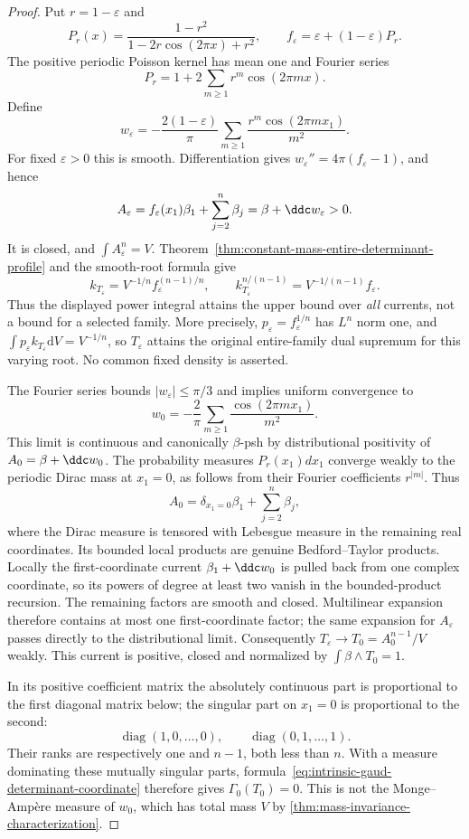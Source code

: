 \begin{proof}
Put $r=1-\varepsilon$ and
\[
 P_r(x)=\frac{1-r^2}{1-2r\cos(2\pi x)+r^2},\qquad
 f_\varepsilon=\varepsilon+(1-\varepsilon)P_r.
\]
The positive periodic Poisson kernel has mean one and Fourier series
\[
 P_r=1+2\sum_{m\geq1}r^m\cos(2\pi mx).
\]
Define
\[
 w_\varepsilon=-\frac{2(1-\varepsilon)}{\pi}
       \sum_{m\geq1}\frac{r^m\cos(2\pi mx_1)}{m^2}.
\]
For fixed $\varepsilon>0$ this is smooth. Differentiation gives
$w_\varepsilon''=4\pi(f_\varepsilon-1)$, and hence
\[
 A_\varepsilon=f_\varepsilon(x_1)\beta_1+
        \sum_{j=2}^n\beta_j=\beta+\ddc w_\varepsilon>0.
\]
It is closed, and $\int A_\varepsilon^n=V$.
Theorem~\ref{thm:constant-mass-entire-determinant-profile} and the smooth-root formula give
\[
 k_{T_\varepsilon}=V^{-1/n}f_\varepsilon^{(n-1)/n},
 \qquad k_{T_\varepsilon}^{n/(n-1)}
       =V^{-1/(n-1)}f_\varepsilon.
\]
Thus the displayed power integral attains the upper bound over
\emph{all} currents, not a bound for a selected family. More
precisely, $p_\varepsilon=f_\varepsilon^{1/n}$ has $L^n$ norm one,
and $\int p_\varepsilon k_{T_\varepsilon}\mathrm dV=V^{-1/n}$, so
$T_\varepsilon$ attains the original entire-family dual supremum
for this varying root. No common fixed density is asserted.

The Fourier series bounds $|w_\varepsilon|\leq\pi/3$ and implies
uniform convergence to
\[
 w_0=-\frac2\pi\sum_{m\geq1}\frac{\cos(2\pi mx_1)}{m^2}.
\]
This limit is continuous and canonically $\beta$-psh by distributional
positivity of $A_0=\beta+\ddc w_0$.
The probability measures $P_r(x_1)dx_1$ converge weakly to the
periodic Dirac mass at $x_1=0$, as follows from their Fourier
coefficients $r^{|m|}$. Thus
\[
 A_0=\delta_{x_1=0}\beta_1+\sum_{j=2}^n\beta_j,
\]
where the Dirac measure is tensored with Lebesgue measure in the
remaining real coordinates. Its bounded local products are genuine
Bedford--Taylor products. Locally the first-coordinate current
$\beta_1+\ddc w_0$ is pulled back from one complex coordinate,
so its powers of degree at least two vanish in the bounded-product
recursion. The remaining factors are smooth and closed.
Multilinear expansion therefore contains at most one first-coordinate
factor; the same expansion for $A_\varepsilon$ passes directly to
the distributional limit. Consequently
$T_\varepsilon\to T_0=A_0^{n-1}/V$ weakly. This current is
positive, closed and normalized by $\int\beta\wedge T_0=1$.

In its positive coefficient matrix the absolutely continuous part is
proportional to the first diagonal matrix below; the singular part
on $x_1=0$ is proportional to the second:
\[
 \operatorname{diag}(1,0,\ldots,0),\qquad
 \operatorname{diag}(0,1,\ldots,1).
\]
Their ranks are respectively
one and $n-1$, both less than $n$. With a measure dominating these
mutually singular parts, formula~\eqref{eq:intrinsic-gaud-determinant-coordinate} therefore gives
$\Gamma_0(T_0)=0$. This is not the Monge--Amp\`ere measure of
$w_0$, which has total mass $V$ by \cref{thm:mass-invariance-characterization}.


\end{proof}
